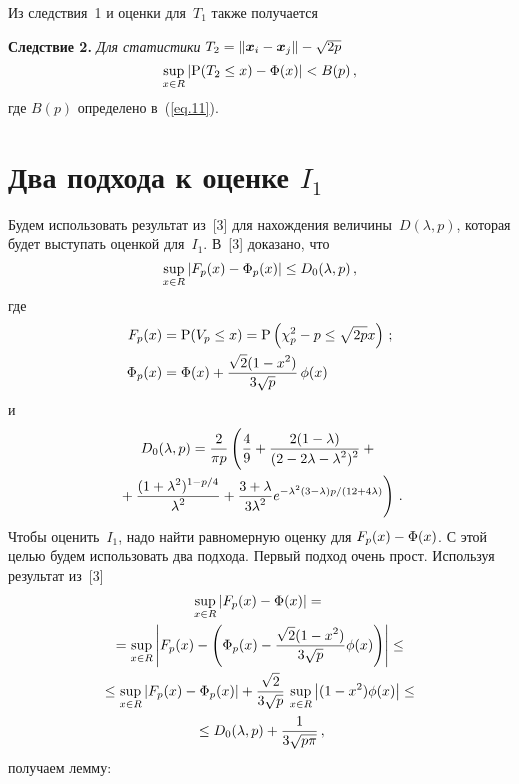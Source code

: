 \begin{multicols}{2}
\medskip

Из следствия~1 и оценки для~$T_1$   также получается

\smallskip

\noindent
\textbf{Следствие 2.}
\textit{Для статистики} $T_2 = \|\mbox{\boldmath{$x$}}_i - \mbox{\boldmath{$x$}}_j\| -\sqrt{2p}$
\begin{equation*}
\sup_{x \in R}|\mbox{\rm P}(T_2 \le x) - \mbox{$\Phi$}(x) | <B(p)\,,
\end{equation*}
где $B(p)$ определено в~(\ref{eq.11}).

\section{Два подхода к оценке $I_1$}

Будем использовать результат из~[3] для на\-хож\-де\-ния величины~$D(\lambda, p)$,
 которая будет выступать оценкой для~$I_1$.
В~[3] доказано, что
\begin{equation*}
\sup\limits_{x \in R} |F_p(x) - \mbox{$\Phi$}_p(x)| \leq D_0(\lambda,p)\,,
\end{equation*}
где
\begin{align*}
F_p(x) &= \mbox{\rm P}(V_p \le x) =\mbox{\rm P}\left(\chi^{2}_p -p \le \sqrt{2p}x\right)\,; \\
\mbox{$\Phi$}_p(x) &= \mbox{$\Phi$}(x) + \displaystyle\frac{\displaystyle \sqrt{2}(1-x^2)\mathstrut}{\displaystyle 3\sqrt{p}\mathstrut}\,\mbox{$\phi$}(x)
\end{align*}
и    
\begin{multline*}
D_0(\lambda,p)= \fr{2}{\pi p}\left(
\vphantom{\fr{(1+\lambda^2)^{1-p/4}}{\lambda^2}}
\fr{4}{9}+\fr{2(1-\lambda)}{(2-2\lambda-\lambda^2)^2}+{}\right.\\
\left.{}+
\fr{(1+\lambda^2)^{1-p/4}}{\lambda^2}+
\fr{3+\lambda}{3\lambda^2}
e^{-\lambda^2(3-\lambda)p/(12+4\lambda)} \right)\,.
\end{multline*}
 Чтобы оценить~$I_1$,  надо найти равномерную оценку для  
$F_p(x) - \mbox{$\Phi$}(x)$.
С этой целью будем использовать два подхода.
Первый подход очень прост. Используя  результат из~[3]
\begin{multline*}
\sup\limits_{x \in R} |F_p(x) - \mbox{$\Phi$}(x)|={}\\
{}  = \sup\limits_{x \in R} \left|F_p(x) - \left(\mbox{$\Phi$}_p(x) -
  \displaystyle\frac{\displaystyle \sqrt{2}(1-x^2)\mathstrut}{\displaystyle 3\sqrt{p}\mathstrut}\mbox{$\phi$}(x)\right)\right|\leq{}\\
{}  \leq \sup\limits_{x \in R} \left|F_p(x) -\mbox{$\Phi$}_p(x) \right|+
  \displaystyle\frac{\displaystyle \sqrt{2}\mathstrut}{\displaystyle 3\sqrt{p}\mathstrut}\,\sup\limits_{x \in R}\left|(1-x^2)\mbox{$\phi$}(x)\right|\leq{}\\
{}\le D_0(\lambda, p) + \displaystyle\frac{\displaystyle 1\mathstrut}{\displaystyle 3\sqrt{p \pi}\mathstrut}\,,
\end{multline*}
получаем лемму:


\end{multicols}
